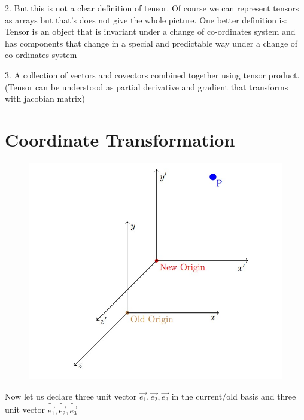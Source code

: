 \documentclass{article}
\begin{document}
	2. But this is not a clear definition of tensor. Of course we can represent tensors as
	arrays but that’s does not give the whole picture. One better definition is:
	Tensor is an object that is invariant under a change of co-ordinates system
	and has components that change in a special and predictable way under a
	change of co-ordinates system
	
	3. A collection of vectors and covectors combined together using tensor product.(Tensor
	can be understood as partial derivative and gradient that transforms with jacobian matrix)
	
	\section*{Coordinate Transformation}
	\begin{figure}[hbp]
		\begin{center}
			\includegraphics[scale=0.45]{2.jpg}
			\label{f2}
		\end{center}
	\end{figure}	
	
	Now let us declare three unit vector $\overrightarrow{e_{1}},\overrightarrow{e_{2}},\overrightarrow{e_{3}}$ in the current/old basis and three unit vector $\widetilde{\overrightarrow{e_{1}}},\widetilde{\overrightarrow{e_{2}}},\widetilde{\overrightarrow{e_{3}}}$
	
\end{document}

